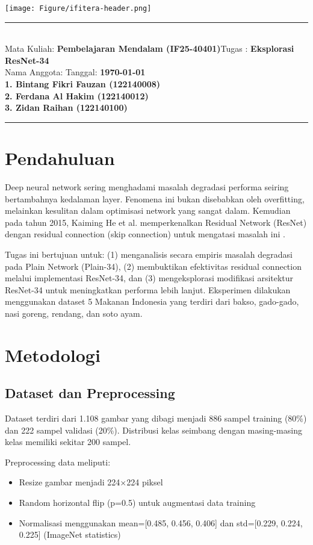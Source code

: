 \documentclass[11pt,a4paper]{article}
\newcommand{\course}{\textbf{Pembelajaran Mendalam (IF25-40401)}}
\newcommand{\studentone}{\textbf{1. Bintang Fikri Fauzan (122140008)}}
\newcommand{\studenttwo}{\textbf{2. Ferdana Al Hakim (122140012)}}
\newcommand{\studentthree}{\textbf{3. Zidan Raihan (122140100)}}
\newcommand{\assignment}{\textbf{Eksplorasi ResNet-34}}
\begin{document}
\thispagestyle{empty}
\begin{center}
    \texttt{[image: Figure/ifitera-header.png]}
\end{center}
\noindent
\rule{17cm}{0.2cm}\\[0.3cm]
Mata Kuliah: \course \hfill Tugas : \assignment\\[0.1cm]
Nama Anggota: \hfill  Tanggal: \textbf{\today}\\[0.1cm]
\studentone \\ \studenttwo \\ \studentthree \\
\rule{17cm}{0.05cm}
\vspace{0.3cm}

\section{Pendahuluan}
Deep neural network sering menghadami masalah degradasi performa seiring bertambahnya kedalaman layer. Fenomena ini bukan disebabkan oleh overfitting, melainkan kesulitan dalam optimisasi network yang sangat dalam. Kemudian pada tahun 2015, Kaiming He et al. memperkenalkan Residual Network (ResNet) dengan residual connection (skip connection) untuk mengatasi masalah ini \cite{he2016deep}.

Tugas ini bertujuan untuk: (1) menganalisis secara empiris masalah degradasi pada Plain Network (Plain-34), (2) membuktikan efektivitas residual connection melalui implementasi ResNet-34, dan (3) mengeksplorasi modifikasi arsitektur ResNet-34 untuk meningkatkan performa lebih lanjut. Eksperimen dilakukan menggunakan dataset 5 Makanan Indonesia yang terdiri dari bakso, gado-gado, nasi goreng, rendang, dan soto ayam.

\section{Metodologi}
\subsection{Dataset dan Preprocessing}
Dataset terdiri dari 1.108 gambar yang dibagi menjadi 886 sampel training (80\%) dan 222 sampel validasi (20\%). Distribusi kelas seimbang dengan masing-masing kelas memiliki sekitar 200 sampel. 

Preprocessing data meliputi:
\begin{itemize}
    \item Resize gambar menjadi 224$\times$224 piksel
    \item Random horizontal flip (p=0.5) untuk augmentasi data training
    \item Normalisasi menggunakan mean=[0.485, 0.456, 0.406] dan std=[0.229, 0.224, 0.225] (ImageNet statistics)
\end{itemize}
\end{document}
